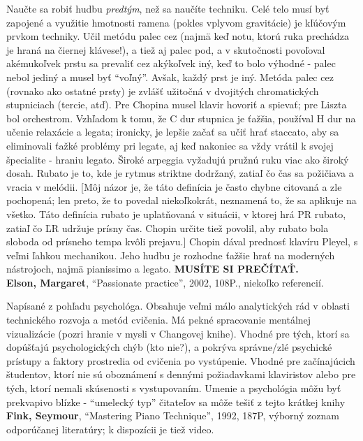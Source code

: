 \documentclass[11pt,a4paper]{book}
\begin{document}
Naučte sa robiť hudbu \textit{predtým}, než sa naučíte techniku. Celé telo musí byť zapojené a využitie hmotnosti ramena (pokles vplyvom gravitácie) je kľúčovým prvkom techniky. Učil metódu palec cez (najmä keď notu, ktorú ruka prechádza je hraná na čiernej klávese!), a tiež aj palec pod, a v skutočnosti povoľoval akémukoľvek prstu sa prevaliť cez akýkoľvek iný, keď to bolo výhodné - palec nebol jediný a musel byť “voľný”. Avšak, každý prst je iný. Metóda palec cez (rovnako ako ostatné prsty) je zvlášť užitočná v dvojitých chromatických stupniciach (tercie, atď). Pre Chopina musel klavir hovoriť a spievať; pre Liszta bol orchestrom. Vzhľadom k tomu, že C dur stupnica je ťažšia, používal H dur na učenie relaxácie a legata; ironicky, je lepšie začať sa učiť hrať staccato, aby sa eliminovali ťažké problémy pri legate, aj keď nakoniec sa vždy vrátil k svojej špecialite - hraniu legato. Široké arpeggia vyžadujú pružnú ruku viac ako široký dosah. Rubato je to, kde je rytmus striktne dodržaný, zatiaľ čo čas sa požičiava a vracia v melódii. [Môj názor je, že táto definícia je často chybne citovaná a zle pochopená; len preto, že to povedal niekoľkokrát, neznamená to, že sa aplikuje na všetko. Táto definícia rubato je uplatňovaná v situácii, v ktorej hrá PR rubato, zatiaľ čo ĽR udržuje prísny čas. Chopin určite tiež povolil, aby rubato bola sloboda od prísneho tempa kvôli prejavu.] Chopin dával prednosť klavíru Pleyel, s veľmi ľahkou mechanikou. Jeho hudbu je rozhodne ťažšie hrať na moderných nástrojoch, najmä pianissimo a legato. \textbf{MUSÍTE SI PREČÍTAŤ.}
\medskip\\
\textbf{Elson, Margaret}, “Passionate practice”, 2002, 108P., niekoľko referencií. 

Napísané z pohľadu psychológa. Obsahuje veľmi málo analytických rád v oblasti technického rozvoja a metód cvičenia. Má pekné spracovanie mentálnej vizualizácie (pozri hranie v mysli v Changovej knihe). Vhodné pre tých, ktorí sa dopúšťajú psychologických chýb (kto nie?), a pokrýva správne/zlé psychické prístupy a faktory prostredia od cvičenia po vystúpenie. Vhodné pre začínajúcich študentov, ktorí nie sú oboznámení s dennými požiadavkami klaviristov alebo pre tých, ktorí nemali skúsenosti s vystupovaním. Umenie a psychológia môžu byť prekvapivo blízke - “umelecký typ” čitateľov sa môže tešiť z tejto krátkej knihy 
\medskip\\
\textbf{\hypertarget{r:fink}{Fink, Seymour}}, “Mastering Piano Technique”, 1992, 187P, výborný zoznam odporúčanej literatúry; k dispozícii je tiež video. 
\end{document}
